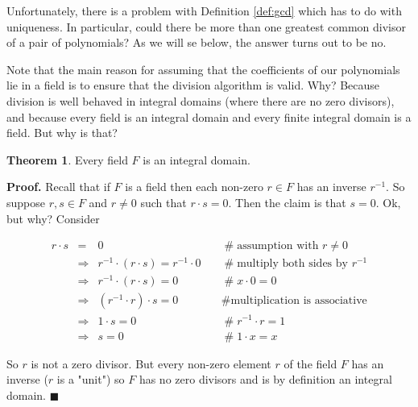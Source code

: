 \documentclass{article}
\theoremstyle{definition}
\newtheorem{theorem}{Theorem}[section]
\begin{document}
\noindent
Unfortunately, there is a problem with Definition \ref{def:gcd}
which has to do with uniqueness. In particular, could there be
more than one greatest common divisor of a pair of polynomials?
As we will se below, the answer turns out to be no.

\bigskip
\noindent
Note that the main reason for assuming that the coefficients of
our polynomials lie in a field is to ensure that the division
algorithm is valid. Why?  Because division is well behaved in
integral domains (where there are no zero divisors), and because
every field is an integral domain and every finite integral
domain is a field. But why is that?


\begin{theorem}
Every field $F$ is an integral domain.
\label{theorem:integral_domain}
\end{theorem}

\noindent
\textbf{Proof.} Recall that if $F$ is a field then each non-zero
$r \in F$ has an inverse $r^{-1}$.  So suppose $r,s \in F$ and $r
\neq 0$ such that $r \cdot s = 0$. Then the claim is that $s =
0$.  Ok, but why? Consider


\begin{equation*}
\begin{array}{rcll} 
r \cdot s
&=& 0                                                   
			&\quad \mathrel{\#} \text{assumption with $r \neq 0$} \\
[5pt]
&\Rightarrow& r^{-1} \cdot (r \cdot s) = r^{-1} \cdot 0 
			&\quad \mathrel{\#} \text{multiply both sides by $r^{-1}$} \\
[5pt]
&\Rightarrow&  r^{-1} \cdot (r \cdot s) =  0            
			&\quad \mathrel{\#} x \cdot 0 = 0 \\
[5pt]
&\Rightarrow&  (r^{-1} \cdot r) \cdot s =  0            
			&\quad \mathrel{\#} \text{multiplication is associative} \\
[5pt]
&\Rightarrow&  1 \cdot s = 0                            
			&\quad \mathrel{\#} r^{-1} \cdot r = 1 \\
[5pt]
&\Rightarrow&  s = 0                                    
			&\quad \mathrel{\#} 1 \cdot x = x
\end{array}
\end{equation*}

\bigskip
\noindent
So $r$ is not a zero divisor. But every non-zero element $r$ of
the field $F$ has an inverse ($r$ is a "unit") so $F$ has no zero
divisors and is by definition an integral domain. $\blacksquare$
\end{document}
